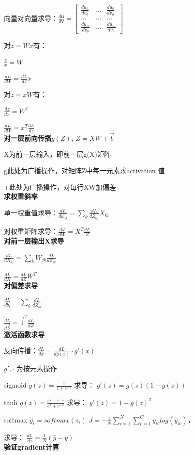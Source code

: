 \documentclass[UTF8]{ctexart}
\begin{document}
  向量对向量求导：$\frac{d\textbf{u}}{d\textbf{v}} = \begin{bmatrix}
    \frac{du_0}{dv_0} & ... & \frac{du_0}{dv_n} \\
    ... & ... & ... \\
    \frac{du_m}{dv_0} & ... & \frac{du_m}{dv_n}
    \end{bmatrix}$
  
  对$z = Wx$有：
  
  \quad $\frac{z}{x} = W$
  
  \quad $\frac{dL}{dW} = \frac{dL}{dz}x$

  对$z = xW$有：
  
  \quad $\frac{dz}{dx} = W^T$

  \quad $\frac{dL}{dW} = x^T\frac{dL}{dz}$\\
\textbf{对一层前向传播$g(Z)$, $Z = XW + \vec{b}$}

  X为前一层输入，即前一层g(X)矩阵
  
  g此处为广播操作，对矩阵Z中每一元素求activation 值
  
  +此处为广播操作，对每行XW加偏差\\
\textbf{求权重斜率}
  
  单一权重值求导：$\frac{dL}{dw_{ij}} = \sum_k \frac{dL}{dZ_{kj}} X_{ki}$

  对权重矩阵求导：$\frac{dJ}{dW} = X^T\frac{dL}{Z}$\\
\textbf{对前一层输出X求导}

  $\frac{dL}{dX_{ij}} = \sum_k W_{jk}\frac{dL}{dZ_{ik}}$

  $\frac{dL}{dX} = \frac{dL}{dZ}W^T$\\
\textbf{对偏差求导}

  $\frac{dL}{db_i} = \sum_k \frac{dL}{dZ_{ki}}$

  $\frac{dL}{d\vec{b}} = \vec{1}^T\frac{dL}{dZ}$\\
\textbf{激活函数求导}

  反向传播：$\frac{dL}{dx} = \frac{dL}{dg(x)} \cdot g'(x)$
  
  \quad $g', \cdot$ 为按元素操作

  sigmoid $g(z) = \frac{1}{1 + e^{-z}}$ 求导： $g'(z) = g(z)(1 - g(z))$

  tanh $g(z) = \frac{e^z - e^{-z}}{e^z + e^{-z}}$ 求导： $g'(z) = 1 - g(z)^2$

  softmax $\hat{y}_i = softmax(z_i)$ $J = -\frac{1}{N}\sum_{i=1}^{N}\sum_{c=1}^{C}y_{ic}log(\hat{y}_{ic})$，
  
  \quad 求导： $\frac{dL}{dz} = \frac{1}{N}(\hat{y} - y)$\\
\textbf{验证gradient计算}
\end{document}
